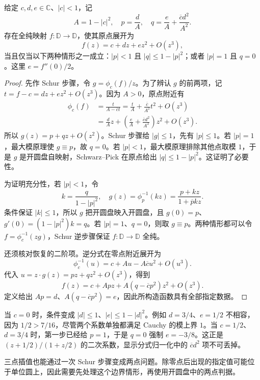 \begin{proposition}\label{b3:prop:06-second-jet}
给定 \(c,d,e\in\mathbb C\)、\(|c|<1\)，记
\[
 A=1-|c|^2,\quad p=\frac dA,\quad
 q=\frac eA+\frac{\overline c d^2}{A^2}.
\]
存在全纯映射 \(f:\mathbb D\rightarrow\mathbb D\)，使其原点展开为
\[
 f(z)=c+dz+ez^2+O(z^3),
\]
当且仅当以下两种情形之一成立：\(|p|<1\) 且 \(|q|\le1-|p|^2\)；或者 \(|p|=1\) 且 \(q=0\)。这里 \(e=f''(0)/2\)。
\end{proposition}
\begin{proof}
先作 Schur 步骤，令 \(g=\phi_c(f)/z\)。为了辨认 \(g\) 的前两项，记 \(t=f-c=dz+ez^2+O(z^3)\)。因为 \(A>0\)，原点附近有
\[
 \begin{aligned}
 \phi_c(f)&=\frac{t}{A-\overline c t}
   =\frac tA+\frac{\overline c}{A^2}t^2+O(z^3)\\
 &=\frac dA z+
   \left(\frac eA+\frac{\overline c d^2}{A^2}\right)z^2+O(z^3).
 \end{aligned}
\]
所以 \(g(z)=p+qz+O(z^2)\)。Schur 步骤给 \(|g|\le1\)，先有 \(|p|\le1\)。若 \(|p|=1\)，最大模原理使 \(g\equiv p\)，故 \(q=0\)。若 \(|p|<1\)，最大模原理排除其他点取模 \(1\)，于是 \(g\) 是开圆盘自映射，Schwarz--Pick 在原点给出 \(|q|\le1-|p|^2\)。这证明了必要性。

为证明充分性，若 \(|p|<1\)，令
\[
 k=\frac q{1-|p|^2},\quad
 g(z)=\phi_p^{-1}(kz)=\frac{p+kz}{1+\overline p kz}.
\]
条件保证 \(|k|\le1\)，所以 \(g\) 把开圆盘映入开圆盘，且 \(g(0)=p\)、\(g'(0)=(1-|p|^2)k=q\)。若 \(|p|=1\)、\(q=0\)，则取 \(g\equiv p\)。两种情形都可以令 \(f=\phi_c^{-1}(zg)\)，Schur 逆步骤保证 \(f:\mathbb D\rightarrow\mathbb D\) 全纯。

还须核对恢复的二阶项。逆分式在零点附近展开为
\[
 \phi_c^{-1}(u)=c+A u-A\overline c u^2+O(u^3).
\]
代入 \(u=z\cdot g(z)=pz+qz^2+O(z^3)\)，得到
\[
 f(z)=c+A pz+A(q-\overline c p^2)z^2+O(z^3).
\]
定义给出 \(Ap=d\)、\(A(q-\overline c p^2)=e\)，因此所构造函数具有全部指定数据。
\end{proof}

当 \(c=0\) 时，条件变成 \(|d|\le1\)、\(|e|\le1-|d|^2\)。例如 \(d=3/4\)、\(e=1/2\) 不相容，因为 \(1/2>7/16\)，尽管两个系数单独都满足 Cauchy 的模上界 \(1\)。当 \(c=1/2\)、\(d=3/4\) 时，第一步已经给 \(p=1\)，于是 \(q=0\) 强制 \(e=-3/8\)。这正是 \((z+1/2)/(1+z/2)\) 的二次系数，显示分式归一化中的 \(\overline c d^2\) 项不可丢掉。

\ProseParagraphBreak

三点插值也能通过一次 Schur 步骤变成两点问题。除零点后出现的指定值可能位于单位圆上，因此需要先处理这个边界情形，再使用开圆盘中的两点判据。

